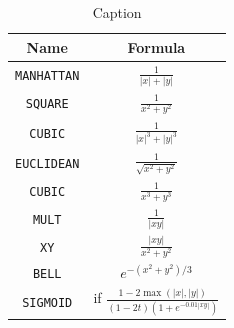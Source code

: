 \documentclass{article}
\begin{document}
\begin{table}[]
    \centering
    \def\arraystretch{1.5}
    \begin{tabular}{|c|c|}
        \hline
        Name & Formula \\
        \hline
        \verb!MANHATTAN! &  $\frac{1}{|x| + |y|}$\\
        \verb!SQUARE! &  $\frac{1}{x^2 + y^2}$\\
        \verb!CUBIC! &  $\frac{1}{|x|^3 + |y|^3}$\\
        \verb!EUCLIDEAN! &   $\frac{1}{\sqrt{x^2 + y^2}}$\\
        \verb!CUBIC! & $\frac{1}{x^3 + y^3}$\\
        \verb!MULT! &  $\frac{1}{|xy|}$\\
        \verb!XY! &  $\frac{|xy|}{x^2 + y^2}$\\
        \verb!BELL! & $e^{-(x^2 + y^2)/3}$\\
        \verb!SIGMOID! & if $\frac{1 - 2\max(|x|,|y|)}{(1-2t)(1 + e^{-0.01|xy|})}$\\
        \hline
    \end{tabular}
    \caption{Caption}
    \label{tab:distances}
\end{table}
\end{document}
